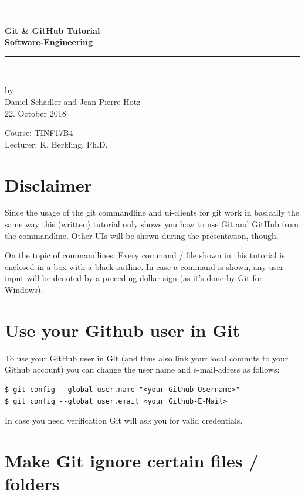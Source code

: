 \documentclass[a4paper, 12pt]{article}
\begin{document}
	
	
	\begin{center}
		\newcommand{\HRule}{\rule{\linewidth}{0.5mm}}
		\HRule \\[0.8cm]
		{ \huge \bfseries Git \& GitHub Tutorial}\\[0.4cm]
		{\LARGE \bfseries Software-Engineering}\\[0.4cm]
		\HRule \\[1.5cm]
		\begin{center}
			by\\[0.2cm]
			Daniel Schädler and Jean-Pierre Hotz\\[0.7cm]
			22. October 2018
		\end{center}
		\vfill
		Course: TINF17B4\\
		Lecturer: K. Berkling, Ph.D.
	\end{center}
	\newpage
	\pagestyle{fancy}

	\section*{Disclaimer}
		
		Since the usage of the git commandline and ui-clients for git work in basically the same way this (written) tutorial only shows you how to use Git and GitHub from the commandline. Other UIs will be shown during the presentation, though.
		
		On the topic of commandlines: Every command / file shown in this tutorial is enclosed in a box with a black outline. In case a command is shown, any user input will be denoted by a preceding dollar sign (as it's done by Git for Windows).
		
	\section{Use your Github user in Git}
	
		To use your GitHub user in Git (and thus also link your local commits to your Github account) you can change the user name and e-mail-adress as follows:
		
		\begin{lstlisting}
$ git config --global user.name "<your Github-Username>"
$ git config --global user.email <your Github-E-Mail>
		\end{lstlisting}
		
		In case you need verification Git will ask you for valid credentials.
				
	\section{Make Git ignore certain files / folders}
		
\end{document}
